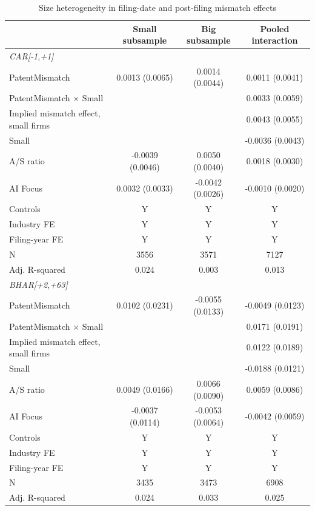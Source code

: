 \begin{table}[!htbp]
\centering
\caption{Size heterogeneity in filing-date and post-filing mismatch effects}
\begin{tabular}{lccc}
\hline
 & Small subsample & Big subsample & Pooled interaction \\
\hline
\multicolumn{4}{l}{\textit{CAR[-1,+1]}} \\
PatentMismatch & 0.0013 (0.0065) & 0.0014 (0.0044) & 0.0011 (0.0041) \\
PatentMismatch × Small &  &  & 0.0033 (0.0059) \\
Implied mismatch effect, small firms &  &  & 0.0043 (0.0055) \\
Small &  &  & -0.0036 (0.0043) \\
A/S ratio & -0.0039 (0.0046) & 0.0050 (0.0040) & 0.0018 (0.0030) \\
AI Focus & 0.0032 (0.0033) & -0.0042 (0.0026) & -0.0010 (0.0020) \\
Controls & Y & Y & Y \\
Industry FE & Y & Y & Y \\
Filing-year FE & Y & Y & Y \\
N & 3556 & 3571 & 7127 \\
Adj. R-squared & 0.024 & 0.003 & 0.013 \\
\multicolumn{4}{l}{\textit{BHAR[+2,+63]}} \\
PatentMismatch & 0.0102 (0.0231) & -0.0055 (0.0133) & -0.0049 (0.0123) \\
PatentMismatch × Small &  &  & 0.0171 (0.0191) \\
Implied mismatch effect, small firms &  &  & 0.0122 (0.0189) \\
Small &  &  & -0.0188 (0.0121) \\
A/S ratio & 0.0049 (0.0166) & 0.0066 (0.0090) & 0.0059 (0.0086) \\
AI Focus & -0.0037 (0.0114) & -0.0053 (0.0064) & -0.0042 (0.0059) \\
Controls & Y & Y & Y \\
Industry FE & Y & Y & Y \\
Filing-year FE & Y & Y & Y \\
N & 3435 & 3473 & 6908 \\
Adj. R-squared & 0.024 & 0.033 & 0.025 \\
\hline
\end{tabular}
\end{table}
